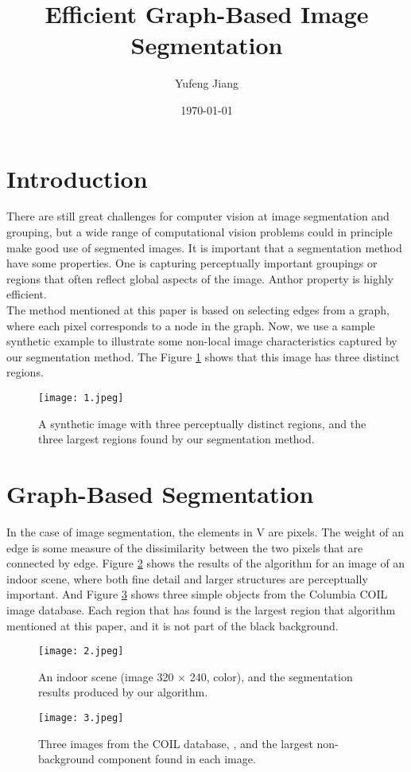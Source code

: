 \documentclass[a4paper,twocolumn]{article}
\title{Efficient Graph-Based Image Segmentation}
\author{Yufeng Jiang}
\date{\today}
\begin{document}
\maketitle
\balance
\section{Introduction}
There are still great challenges for computer vision at image segmentation and grouping, but a wide range of computational vision problems could in principle make good use of segmented images. It is important that a segmentation method have some properties. One is capturing perceptually important groupings or regions that often reflect global aspects of the image. Anthor property is highly efficient.\\
\indent The method mentioned at this paper is based on selecting edges from a graph, where each pixel corresponds to a node in the graph. Now, we use a sample synthetic example to illustrate some non-local image characteristics captured by our segmentation method. The Figure \ref{fig1} shows that this image has three distinct regions.\\
\begin{figure}[htbp]
\centering
\texttt{[image: 1.jpeg]}
\caption{A synthetic image with three perceptually distinct regions, and the three largest regions found by our segmentation method.}
\label{fig1}
\end{figure}
\section{Graph-Based Segmentation}
In the case of image segmentation, the elements in V are pixels. The weight of an edge is some measure of the dissimilarity between the two pixels that are connected by edge. Figure \ref{fig2} shows the results of the algorithm for an image of an indoor scene, where both fine detail and larger structures are perceptually important. And Figure \ref{fig3} shows three simple objects from the Columbia COIL image database. Each region that has found is the largest region that algorithm mentioned at this paper, and it is not part of the black background\cite{segmentation}.
\begin{figure}[htbp]
\centering
\texttt{[image: 2.jpeg]}
\caption{An indoor scene (image 320 × 240, color), and the segmentation results produced by our algorithm.}
\label{fig2}
\end{figure}
\begin{figure}[htbp]
\centering
\texttt{[image: 3.jpeg]}
\caption{Three images from the COIL database, , and the largest non-background component found in each image.}
\label{fig3}
\end{figure}
\onecolumn

\end{document}
